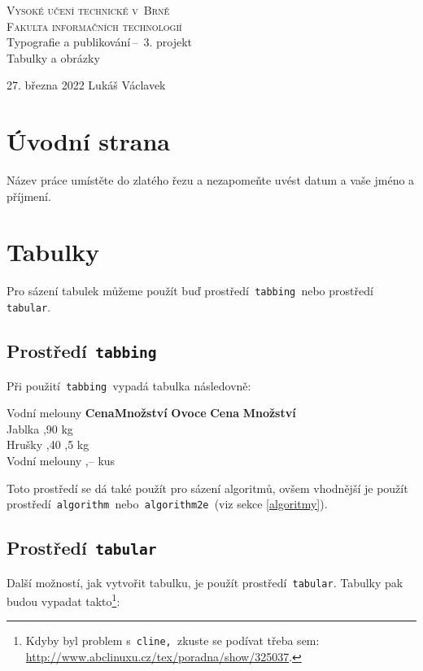 \documentclass[a4paper, 11pt]{article}
\begin{document}
\begin{titlepage}
\begin{center} 
\textsc{\Huge Vysoké učení technické v~Brně\\
\huge Fakulta informačních technologií \\}
\LARGE Typografie a publikování\,--\ 3. projekt\\
\Huge Tabulky a obrázky
\end{center}
\Large 27. března 2022 \hfill Lukáš Václavek
\end{titlepage}

\section{Úvodní strana}
Název práce umístěte do zlatého řezu a nezapomeňte uvést  datum a vaše jméno a příjmení.

\section{Tabulky}
Pro sázení tabulek můžeme použít buď prostředí\texttt{ tabbing }nebo prostředí\texttt{ tabular}.

\subsection{Prostředí\texttt{ tabbing}}
Při použití\texttt{ tabbing }vypadá tabulka následovně:

\begin{tabbing}
Vodní melouny \quad  \=\textbf{Cena}\quad   \=\textbf{Množství}\kill
\textbf{Ovoce}  \>\textbf{Cena} \>\textbf{Množství}\\
Jablka          ,90         kg\\
Hrušky          ,40        ,5 kg\\
Vodní melouny   ,--         kus\\
\end{tabbing}
Toto prostředí se dá také použít pro sázení algoritmů, ovšem vhodnější je použít prostředí\texttt{ algorithm }nebo\texttt{ algorithm2e }(viz sekce \ref{algoritmy}).

\subsection{Prostředí\texttt{ tabular}}
Další možností, jak vytvořit tabulku, je použít prostředí\texttt{ tabular}. Tabulky pak budou vypadat takto\footnote{Kdyby byl problem s\texttt{ cline, }zkuste se podívat třeba sem: \href{http://www.abclinuxu.cz/tex/poradna/show/325037}{http://www.abclinuxu.cz/tex/poradna/show/325037}.}:
\end{document}

